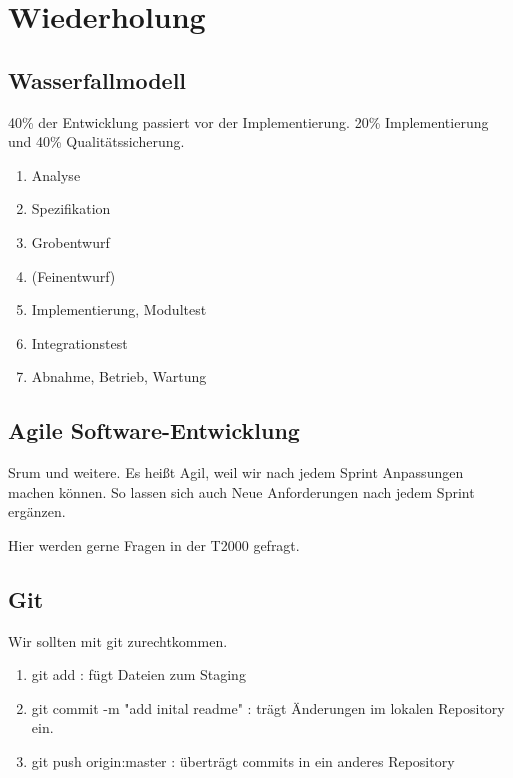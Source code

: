 \documentclass[a4paper]{article}
\title{\docTitle}
\author{Moritz}
\date{\today}
\begin{document}
\maketitle
\tableofcontents


\section{Wiederholung}

\subsection{Wasserfallmodell}

40\% der Entwicklung passiert vor der Implementierung. 20\% Implementierung und 40\% Qualitätssicherung.

\begin{enumerate}
    \item Analyse
    \item Spezifikation
    \item Grobentwurf
    \item (Feinentwurf)
    \item Implementierung, Modultest
    \item Integrationstest
    \item Abnahme, Betrieb, Wartung
\end{enumerate}

\subsection{Agile Software-Entwicklung}

Srum und weitere. Es heißt Agil, weil wir nach jedem Sprint Anpassungen machen können. So lassen sich auch Neue Anforderungen nach jedem Sprint ergänzen.

Hier werden gerne Fragen in der T2000 gefragt.

\subsection{Git}

Wir sollten mit git zurechtkommen. 

\begin{enumerate}
    \item git add : fügt Dateien zum Staging
    \item git commit -m "add inital readme" : trägt Änderungen im lokalen Repository ein.
    \item git push origin:master : überträgt commits in ein anderes Repository
\end{enumerate}
\end{document}

